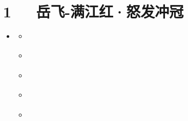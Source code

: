 \documentclass[letterpaper,12pt,english]{sphinxmanual}
\begin{document}
\chapter{1   岳飞-满江红·怒发冲冠}
\label{\detokenize{p01_u6563_u6587/_u5cb3_u98de-_u6ee1_u6c5f_u7ea2_xb7_u6012_u53d1_u51b2_u51a0:id1}}\label{\detokenize{p01_u6563_u6587/_u5cb3_u98de-_u6ee1_u6c5f_u7ea2_xb7_u6012_u53d1_u51b2_u51a0::doc}}
\begin{sphinxShadowBox}
\begin{itemize}
\item {} 
\label{\detokenize{p01_u6563_u6587/_u5cb3_u98de-_u6ee1_u6c5f_u7ea2_xb7_u6012_u53d1_u51b2_u51a0:id10}}{\hyperref[\detokenize{p01_u6563_u6587/_u5cb3_u98de-_u6ee1_u6c5f_u7ea2_xb7_u6012_u53d1_u51b2_u51a0:id1}]{}}
\begin{itemize}
\item {} 
\label{\detokenize{p01_u6563_u6587/_u5cb3_u98de-_u6ee1_u6c5f_u7ea2_xb7_u6012_u53d1_u51b2_u51a0:id11}}{\hyperref[\detokenize{p01_u6563_u6587/_u5cb3_u98de-_u6ee1_u6c5f_u7ea2_xb7_u6012_u53d1_u51b2_u51a0:id3}]{}}

\item {} 
\label{\detokenize{p01_u6563_u6587/_u5cb3_u98de-_u6ee1_u6c5f_u7ea2_xb7_u6012_u53d1_u51b2_u51a0:id12}}{\hyperref[\detokenize{p01_u6563_u6587/_u5cb3_u98de-_u6ee1_u6c5f_u7ea2_xb7_u6012_u53d1_u51b2_u51a0:id4}]{}}

\item {} 
\label{\detokenize{p01_u6563_u6587/_u5cb3_u98de-_u6ee1_u6c5f_u7ea2_xb7_u6012_u53d1_u51b2_u51a0:id13}}{\hyperref[\detokenize{p01_u6563_u6587/_u5cb3_u98de-_u6ee1_u6c5f_u7ea2_xb7_u6012_u53d1_u51b2_u51a0:id5}]{}}

\item {} 
\label{\detokenize{p01_u6563_u6587/_u5cb3_u98de-_u6ee1_u6c5f_u7ea2_xb7_u6012_u53d1_u51b2_u51a0:id14}}{\hyperref[\detokenize{p01_u6563_u6587/_u5cb3_u98de-_u6ee1_u6c5f_u7ea2_xb7_u6012_u53d1_u51b2_u51a0:id6}]{}}

\item {} 
\label{\detokenize{p01_u6563_u6587/_u5cb3_u98de-_u6ee1_u6c5f_u7ea2_xb7_u6012_u53d1_u51b2_u51a0:id15}}{\hyperref[\detokenize{p01_u6563_u6587/_u5cb3_u98de-_u6ee1_u6c5f_u7ea2_xb7_u6012_u53d1_u51b2_u51a0:id7}]{}}


\end{itemize}
\end{itemize}
\end{sphinxShadowBox}
\end{document}
